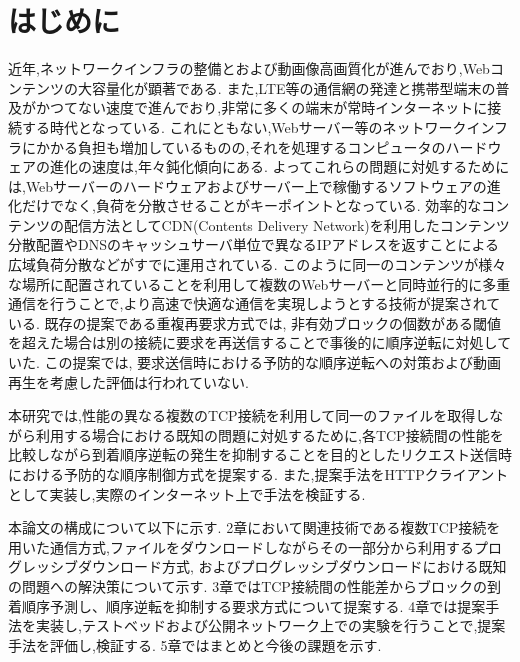 \documentclass[a4j,12pt]{gradthesis_utf8}
\begin{document}
 
\maketitle %

\chapter{はじめに}\label{sec:sec1}
近年,ネットワークインフラの整備とおよび動画像高画質化が進んでおり,Webコンテンツの大容量化が顕著である.
また,LTE等の通信網の発達と携帯型端末の普及がかつてない速度で進んでおり,非常に多くの端末が常時インターネットに接続する時代となっている.
これにともない,Webサーバー等のネットワークインフラにかかる負担も増加しているものの,それを処理するコンピュータのハードウェアの進化の速度は,年々鈍化傾向にある.
よってこれらの問題に対処するためには,Webサーバーのハードウェアおよびサーバー上で稼働するソフトウェアの進化だけでなく,負荷を分散させることがキーポイントとなっている.
効率的なコンテンツの配信方法としてCDN(Contents Delivery Network)を利用したコンテンツ分散配置やDNSのキャッシュサーバ単位で異なるIPアドレスを返すことによる広域負荷分散などがすでに運用されている.
このように同一のコンテンツが様々な場所に配置されていることを利用して複数のWebサーバーと同時並行的に多重通信を行うことで,より高速で快適な通信を実現しようとする技術が提案されている.
既存の提案である重複再要求方式では, 
非有効ブロックの個数がある閾値を超えた場合は別の接続に要求を再送信することで事後的に順序逆転に対処していた.
この提案では, 要求送信時における予防的な順序逆転への対策および動画再生を考慮した評価は行われていない.

本研究では,性能の異なる複数のTCP接続を利用して同一のファイルを取得しながら利用する場合における既知の問題に対処するために,各TCP接続間の性能を比較しながら到着順序逆転の発生を抑制することを目的としたリクエスト送信時における予防的な順序制御方式を提案する.
また,提案手法をHTTPクライアントとして実装し,実際のインターネット上で手法を検証する.

本論文の構成について以下に示す.
2章において関連技術である複数TCP接続を用いた通信方式,ファイルをダウンロードしながらその一部分から利用するプログレッシブダウンロード方式, およびプログレッシブダウンロードにおける既知の問題への解決策について示す.
3章ではTCP接続間の性能差からブロックの到着順序予測し、順序逆転を抑制する要求方式について提案する.
4章では提案手法を実装し,テストベッドおよび公開ネットワーク上での実験を行うことで,提案手法を評価し,検証する.
5章ではまとめと今後の課題を示す.
\end{document}
